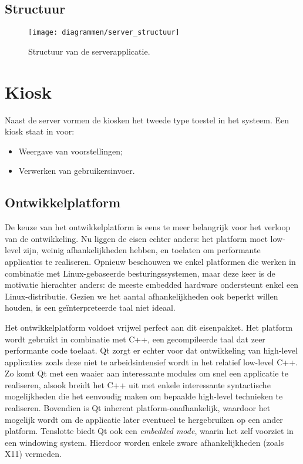 \subsection{Structuur}

\begin{figure}
	\texttt{[image: diagrammen/server\_structuur]}
	\caption{Structuur van de serverapplicatie.}
\end{figure}

\section{Kiosk}
\label{sec:kiosk}

Naast de server vormen de kiosken het tweede type toestel in het systeem. Een kiosk staat in voor:
\begin{itemize}
\item Weergave van voorstellingen;
\item Verwerken van gebruikersinvoer.
\end{itemize}

\subsection{Ontwikkelplatform}

De keuze van het ontwikkelplatform is eens te meer belangrijk voor het verloop van de ontwikkeling. Nu liggen de eisen echter anders: het platform moet low-level zijn, weinig afhankelijkheden hebben, en toelaten om performante applicaties te realiseren. Opnieuw beschouwen we enkel platformen die werken in combinatie met Linux-gebaseerde besturingssystemen, maar deze keer is de motivatie hierachter anders: de meeste embedded hardware ondersteunt enkel een Linux-distributie. Gezien we het aantal afhankelijkheden ook beperkt willen houden, is een geïnterpreteerde taal niet ideaal.

Het ontwikkelplatform  voldoet vrijwel perfect aan dit eisenpakket. Het platform wordt gebruikt in combinatie met C++, een gecompileerde taal dat zeer performante code toelaat. Qt zorgt er echter voor dat ontwikkeling van high-level applicaties zoals deze niet te arbeidsintensief wordt in het relatief low-level C++. Zo komt Qt met een waaier aan interessante modules om snel een applicatie te realiseren, alsook breidt het C++ uit met enkele interessante syntactische mogelijkheden die het eenvoudig maken om bepaalde high-level technieken te realiseren. Bovendien is Qt inherent platform-onafhankelijk, waardoor het mogelijk wordt om de applicatie later eventueel te hergebruiken op een ander platform. Tenslotte biedt Qt ook een \emph{embedded mode}, waarin het zelf voorziet in een windowing system. Hierdoor worden enkele zware afhankelijkheden (zoals X11) vermeden.

